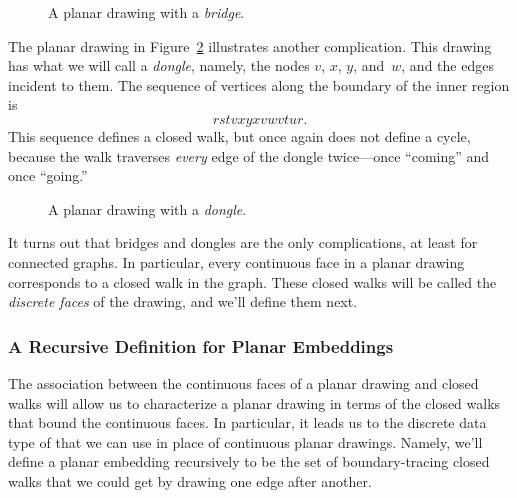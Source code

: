 \begin{figure}


\caption{A planar drawing with a \emph{bridge}.}
\label{fig:bridge}
\end{figure}

The planar drawing in Figure~\ref{fig:dongle} illustrates another
complication.  This drawing has what we will call a \emph{dongle},
namely, the nodes $v$, $x$, $y$, and~$w$, and the edges incident to
them.  The sequence of vertices along the boundary
of the inner region is
\[
rstvxyxvwvtur.
\]
This sequence defines a closed walk, but once again does not define a
cycle, because the walk traverses \emph{every} edge of the dongle
twice---once ``coming'' and once ``going.''

\begin{figure}


\caption{A planar drawing with a \emph{dongle}.}
\label{fig:dongle}
\end{figure}

It turns out that bridges and dongles are the only complications, at least
for connected graphs.  In particular, every continuous face in a planar
drawing corresponds to a closed walk in the graph.  These closed walks
will be called the \emph{discrete faces} of the drawing, and we'll define
them next.

\subsubsection{A Recursive Definition for Planar Embeddings}

The association between the continuous faces of a planar drawing and
closed walks will allow us to characterize a planar drawing in terms
of the closed walks that bound the continuous faces.  In particular,
it leads us to the discrete data type of 
that we can use in place of continuous planar drawings.  Namely,
we'll define a planar embedding recursively to be the set of
boundary-tracing closed walks that we could get by drawing one edge
after another.

